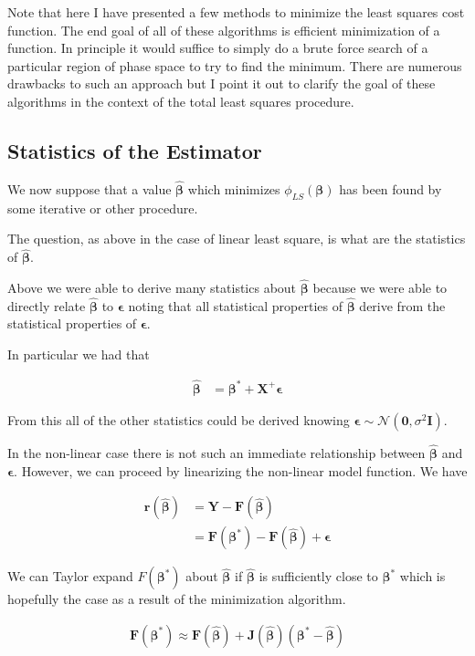 \documentclass[12pt]{article}
\newcommand{\ep}{\epsilon}
\newcommand{\bv}[1]{\boldsymbol{#1}}
\begin{document}
Note that here I have presented a few methods to minimize the least squares cost function.
The end goal of all of these algorithms is efficient minimization of a function.
In principle it would suffice to simply do a brute force search of a particular region of phase space to try to find the minimum.
There are numerous drawbacks to such an approach but I point it out to clarify the goal of these algorithms in the context of the total least squares procedure. 

\subsection{Statistics of the Estimator}

We now suppose that a value $\bv{\hat{\beta}}$ which minimizes $\phi_{LS}(\bv{\beta})$ has been found by some iterative or other procedure.

The question, as above in the case of linear least square, is what are the statistics of $\bv{\hat{\beta}}$.

Above we were able to derive many statistics about $\bv{\hat{\beta}}$ because we were able to directly relate $\bv{\hat{\beta}}$ to $\bv{\ep}$ noting that all statistical properties of $\bv{\hat{\beta}}$ derive from the statistical properties of $\bv{\ep}$.

In particular we had that

\begin{align}
\bv{\hat{\beta}} &= \bv{\beta^*} + \bv{X}^+\bv{\ep}
\end{align}

From this all of the other statistics could be derived knowing $\bv{\ep} \sim \mathcal{N}(\bv{0}, \sigma^2\bv{I})$.

In the non-linear case there is not such an immediate relationship between $\bv{\hat{\beta}}$ and $\bv{\ep}$.
However, we can proceed by linearizing the non-linear model function.
We have

\begin{align}
\bv{r}(\bv{\hat{\beta}}) &= \bv{Y} - \bv{F}(\bv{\hat{\beta}})\\
&= \bv{F}(\bv{\beta^*}) - \bv{F}(\bv{\hat{\beta}}) + \bv{\ep}
\end{align}

We can Taylor expand $F(\bv{\beta^*})$ about $\bv{\hat{\beta}}$ if $\bv{\hat{\beta}}$ is sufficiently close to $\bv{\beta^*}$ which is hopefully the case as a result of the minimization algorithm.

\begin{align}
\bv{F}(\bv{\beta^*}) \approx \bv{F}(\bv{\hat{\beta}}) + \bv{J}(\bv{\hat{\beta}})(\bv{\beta^*} - \bv{\hat{\beta}})
\end{align}
\end{document}
